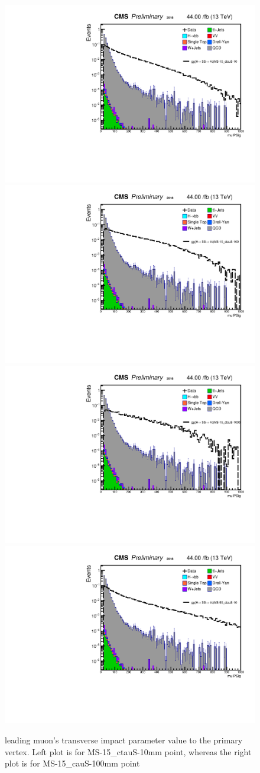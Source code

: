  \begin{figure}[h!]
   \caption{leading muon's transverse impact parameter value to the primary vertex. Left plot is for MS-15\_ctauS-10mm point, whereas the right plot is for MS-15\_cauS-100mm point}
   \label{fig:leadmuIP}
   \centering
   \includegraphics[width=0.47\linewidth]{figs/log_Oct6ANVars_MS-15_ctauS-10_muIPSig.pdf}
   \includegraphics[width=0.47\linewidth]{figs/log_Oct6ANVars_MS-15_ctauS-100_muIPSig.pdf}
   \includegraphics[width=0.47\linewidth]{figs/log_Oct6ANVars_MS-15_ctauS-1000_muIPSig.pdf}
   \includegraphics[width=0.47\linewidth]{figs/log_Oct6ANVars_MS-55_ctauS-10_muIPSig.pdf}
 \end{figure}

